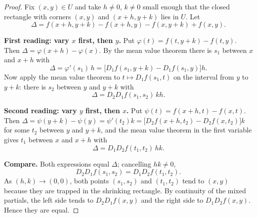 \begin{center}
\end{center}

\begin{proof}
Fix $(x,y)\in U$ and take $h\neq0$, $k\neq0$ small enough that the closed rectangle with
corners $(x,y)$ and $(x+h,y+k)$ lies in $U$. Let
\[ \Delta=f(x+h,y+k)-f(x+h,y)-f(x,y+k)+f(x,y). \]

\textbf{First reading: vary $x$ first, then $y$.} Put $\varphi(t)=f(t,y+k)-f(t,y)$. Then
$\Delta=\varphi(x+h)-\varphi(x)$. By the mean value theorem there is $s_1$ between $x$ and
$x+h$ with
\[ \Delta=\varphi'(s_1)\,h=\big[D_1f(s_1,y+k)-D_1f(s_1,y)\big]h . \]
Now apply the mean value theorem to $t\mapsto D_1f(s_1,t)$ on the interval from $y$ to
$y+k$: there is $s_2$ between $y$ and $y+k$ with
\[ \Delta=D_2D_1f(s_1,s_2)\,kh . \]

\textbf{Second reading: vary $y$ first, then $x$.} Put $\psi(t)=f(x+h,t)-f(x,t)$. Then
$\Delta=\psi(y+k)-\psi(y)=\psi'(t_2)k=\big[D_2f(x+h,t_2)-D_2f(x,t_2)\big]k$ for some $t_2$
between $y$ and $y+k$, and the mean value theorem in the first variable gives $t_1$ between
$x$ and $x+h$ with
\[ \Delta=D_1D_2f(t_1,t_2)\,hk . \]

\textbf{Compare.} Both expressions equal $\Delta$; cancelling $hk\neq0$,
\[ D_2D_1f(s_1,s_2)=D_1D_2f(t_1,t_2). \]
As $(h,k)\to(0,0)$, both points $(s_1,s_2)$ and $(t_1,t_2)$ tend to $(x,y)$ because they are
trapped in the shrinking rectangle. By continuity of the mixed partials, the left side
tends to $D_2D_1f(x,y)$ and the right side to $D_1D_2f(x,y)$. Hence they are equal.
\end{proof}

